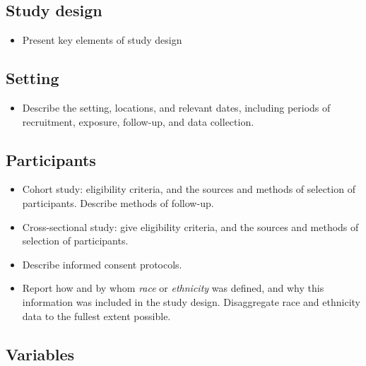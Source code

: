 \documentclass[
  letterpaper,
  DIV=11,
  numbers=noendperiod]{scrartcl}
\providecommand{\tightlist}{%
  \setlength{\itemsep}{0pt}\setlength{\parskip}{0pt}}\usepackage{longtable,booktabs,array}
\begin{document}
\subsection{Study design}\label{sec-design}

\begin{itemize}
\tightlist
\item
  Present key elements of study design
\end{itemize}

\subsection{Setting}\label{sec-setting}

\begin{itemize}
\tightlist
\item
  Describe the setting, locations, and relevant dates, including periods
  of recruitment, exposure, follow-up, and data collection.
\end{itemize}

\subsection{Participants}\label{sec-participants}

\begin{itemize}
\tightlist
\item
  Cohort study: eligibility criteria, and the sources and methods of
  selection of participants. Describe methods of follow-up.
\item
  Cross-sectional study: give eligibility criteria, and the sources and
  methods of selection of participants.
\item
  Describe informed consent protocols.
\item
  Report how and by whom \emph{race} or \emph{ethnicity} was defined,
  and why this information was included in the study design.
  Disaggregate race and ethnicity data to the fullest extent possible.
\end{itemize}

\subsection{Variables}\label{sec-vars}
\end{document}

